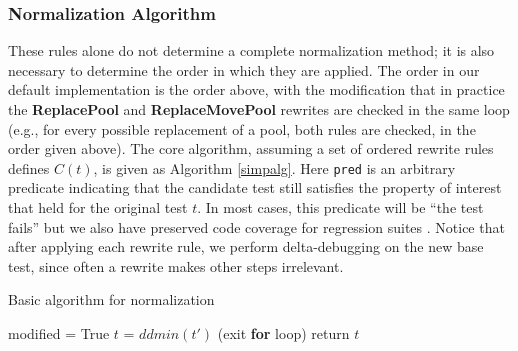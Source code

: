 \subsubsection{Normalization Algorithm}
\label{formalexample}

These rules alone do not determine a complete normalization method; it is
also necessary to determine the order in which they are applied.  The
order in our default implementation is the order above, with the
modification that in practice the {\bf ReplacePool} and {\bf
  ReplaceMovePool} rewrites are checked in the same loop
(e.g., for every possible replacement of a pool, both rules are
checked, in the order given above).  The core algorithm, assuming a set
of ordered rewrite rules defines $C(t)$, is given as Algorithm
\ref{simpalg}.  Here {\tt pred} is an arbitrary predicate indicating
that the candidate test still satisfies the property of interest that
held for the original test $t$.  In most cases, this predicate will be
``the test fails'' but we also have preserved
code coverage for regression suites \cite{icst2014}.  Notice that
after applying each rewrite rule, we perform delta-debugging on the
new base test, since often a rewrite makes other steps irrelevant.

\begin{algorithm}
\caption{Basic algorithm for normalization}
\label{simpalg}
{%
\begin{algorithmic}[1]
\State modified = True 
\State $t$ = $ddmin(t')$
 (exit {\bf for} loop) 
\EndIf 
\EndFor 
\EndWhile 
\State return $t$
\end{algorithmic}
}
\end{algorithm}

